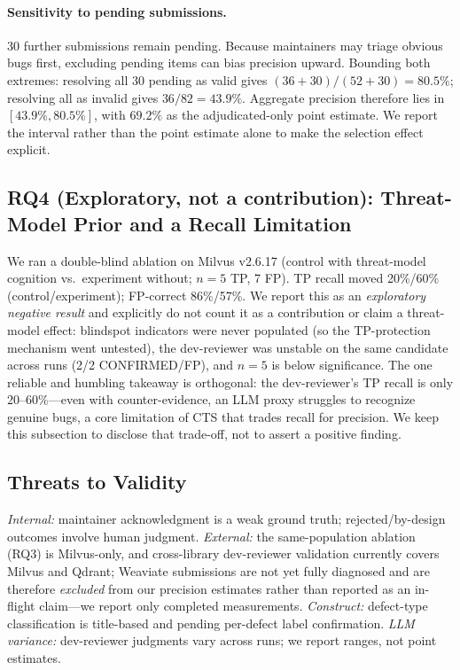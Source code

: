 \documentclass[sigconf]{acmart}
\begin{document}
\paragraph{Sensitivity to pending submissions.} 30 further submissions remain pending. Because maintainers may triage obvious bugs first, excluding pending items can bias precision upward. Bounding both extremes: resolving all 30 pending as valid gives $(36{+}30)/(52{+}30)=80.5\%$; resolving all as invalid gives $36/82=43.9\%$. Aggregate precision therefore lies in $[43.9\%, 80.5\%]$, with $69.2\%$ as the adjudicated-only point estimate. We report the interval rather than the point estimate alone to make the selection effect explicit.

\subsection{RQ4 (Exploratory, not a contribution): Threat-Model Prior and a Recall Limitation}\label{sec:eval-tm}
We ran a double-blind ablation on Milvus v2.6.17 (control with threat-model cognition vs.\ experiment without; $n{=}5$ TP, 7 FP). TP recall moved 20\%/60\% (control/experiment); FP-correct 86\%/57\%. We report this as an \emph{exploratory negative result} and explicitly do not count it as a contribution or claim a threat-model effect: blindspot indicators were never populated (so the TP-protection mechanism went untested), the dev-reviewer was unstable on the same candidate across runs (2/2 CONFIRMED/FP), and $n{=}5$ is below significance. The one reliable and humbling takeaway is orthogonal: the dev-reviewer's TP recall is only 20--60\%---even with counter-evidence, an LLM proxy struggles to recognize genuine bugs, a core limitation of CTS that trades recall for precision. We keep this subsection to disclose that trade-off, not to assert a positive finding.

\subsection{Threats to Validity}
\emph{Internal:} maintainer acknowledgment is a weak ground truth; rejected/by-design outcomes involve human judgment. \emph{External:} the same-population ablation (RQ3) is Milvus-only, and cross-library dev-reviewer validation currently covers Milvus and Qdrant; Weaviate submissions are not yet fully diagnosed and are therefore \emph{excluded} from our precision estimates rather than reported as an in-flight claim---we report only completed measurements. \emph{Construct:} defect-type classification is title-based and pending per-defect label confirmation. \emph{LLM variance:} dev-reviewer judgments vary across runs; we report ranges, not point estimates.
\end{document}
